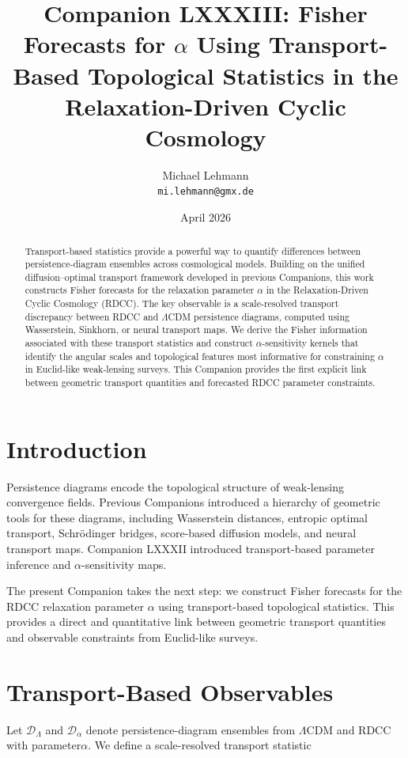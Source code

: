 \documentclass[11pt,a4paper]{article}
\title{\textbf{Companion LXXXIII: Fisher Forecasts for $\alpha$ Using Transport-Based Topological Statistics in the Relaxation-Driven Cyclic Cosmology}}
\author{Michael Lehmann \\ \texttt{mi.lehmann@gmx.de}}
\date{April 2026}
\begin{document}
\maketitle

\begin{abstract}
Transport-based statistics provide a powerful way to quantify differences between 
persistence-diagram ensembles across cosmological models. Building on the unified 
diffusion--optimal transport framework developed in previous Companions, this work 
constructs Fisher forecasts for the relaxation parameter $\alpha$ in the 
Relaxation-Driven Cyclic Cosmology (RDCC). The key observable is a 
scale-resolved transport discrepancy between RDCC and $\Lambda$CDM persistence 
diagrams, computed using Wasserstein, Sinkhorn, or neural transport maps. We 
derive the Fisher information associated with these transport statistics and 
construct $\alpha$-sensitivity kernels that identify the angular scales and 
topological features most informative for constraining $\alpha$ in Euclid-like 
weak-lensing surveys. This Companion provides the first explicit link between 
geometric transport quantities and forecasted RDCC parameter constraints.
\end{abstract}
\section{Introduction}

Persistence diagrams encode the topological structure of weak-lensing convergence 
fields. Previous Companions introduced a hierarchy of geometric tools for these 
diagrams, including Wasserstein distances, entropic optimal transport, 
Schrödinger bridges, score-based diffusion models, and neural transport maps. 
Companion LXXXII introduced transport-based parameter inference and 
$\alpha$-sensitivity maps.

The present Companion takes the next step: we construct Fisher forecasts for the 
RDCC relaxation parameter $\alpha$ using transport-based topological statistics. 
This provides a direct and quantitative link between geometric transport 
quantities and observable constraints from Euclid-like surveys.
\section{Transport-Based Observables}

Let $\mathcal{D}_{\Lambda}$ and $\mathcal{D}_{\alpha}$ denote persistence-diagram 
ensembles from $\Lambda$CDM and RDCC with parameter$\alpha$. We define a 
scale-resolved transport statistic
\end{document}
